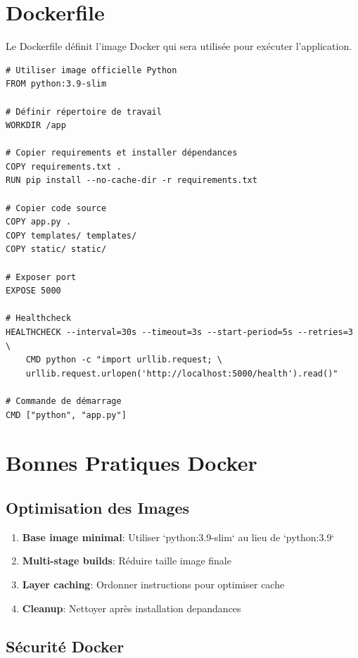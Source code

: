 \documentclass[12pt,a4paper]{report}
\begin{document}
\section{Dockerfile}

Le Dockerfile définit l'image Docker qui sera utilisée pour exécuter l'application.

\begin{lstlisting}
# Utiliser image officielle Python
FROM python:3.9-slim

# Définir répertoire de travail
WORKDIR /app

# Copier requirements et installer dépendances
COPY requirements.txt .
RUN pip install --no-cache-dir -r requirements.txt

# Copier code source
COPY app.py .
COPY templates/ templates/
COPY static/ static/

# Exposer port
EXPOSE 5000

# Healthcheck
HEALTHCHECK --interval=30s --timeout=3s --start-period=5s --retries=3 \
    CMD python -c "import urllib.request; \
    urllib.request.urlopen('http://localhost:5000/health').read()"

# Commande de démarrage
CMD ["python", "app.py"]
\end{lstlisting}

\section{Bonnes Pratiques Docker}

\subsection{Optimisation des Images}

\begin{enumerate}
    \item \textbf{Base image minimal}: Utiliser `python:3.9-slim` au lieu de `python:3.9`
    \item \textbf{Multi-stage builds}: Réduire taille image finale
    \item \textbf{Layer caching}: Ordonner instructions pour optimiser cache
    \item \textbf{Cleanup}: Nettoyer après installation depandances
\end{enumerate}

\subsection{Sécurité Docker}
\end{document}
